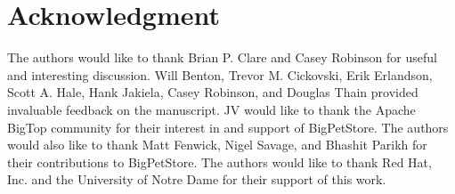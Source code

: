 \documentclass[conference]{IEEEtran}
\begin{document}






\section*{Acknowledgment}
The authors would like to thank Brian P. Clare and Casey Robinson for useful and interesting discussion.  Will Benton, Trevor M. Cickovski, Erik Erlandson, Scott A. Hale, Hank Jakiela, Casey Robinson, and Douglas Thain provided invaluable feedback on the manuscript.  JV would like to thank the Apache BigTop community for their interest in and support of BigPetStore.  The authors would also like to thank Matt Fenwick, Nigel Savage, and Bhashit Parikh for their contributions to BigPetStore. The authors would like to thank Red Hat, Inc. and the University of Notre Dame for their support of this work.









%
%








\end{document}
